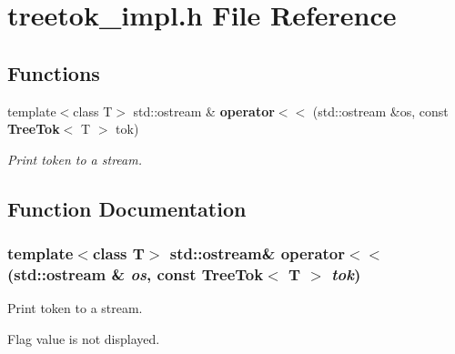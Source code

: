 \section{treetok\_\-impl.h File Reference}
\label{treetok__impl_8h}
\subsection*{Functions}
\begin{CompactItemize}
\item 
template$<$class T$>$ std::ostream \& {\bf operator$<$$<$} (std::ostream \&os, const {\bf Tree\-Tok}$<$ T $>$ tok)
\begin{CompactList}\small\item\em Print token to a stream. \item\end{CompactList}\end{CompactItemize}


\subsection{Function Documentation}
\subsubsection{\setlength{\rightskip}{0pt plus 5cm}template$<$class T$>$ std::ostream\& operator$<$$<$ (std::ostream \& {\em os}, const {\bf Tree\-Tok}$<$ T $>$ {\em tok})}\label{treetok__impl_8h_a0}


Print token to a stream. 

Flag value is not displayed. 